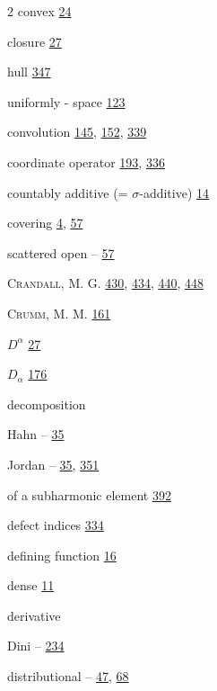 \begin{multicols}{2}
\noindent convex \hyperlink{page.24}{24}\par
\hspace*{1.1em}closure \hyperlink{page.27}{27}\par
\hspace*{1.1em}hull \hyperlink{page.347}{347}\par
\hspace*{1.1em}uniformly - space \hyperlink{page.123}{123}\par
\noindent convolution \hyperlink{page.145}{145}, \hyperlink{page.152}{152}, \hyperlink{page.339}{339}\par
\noindent coordinate operator \hyperlink{page.193}{193}, \hyperlink{page.336}{336}\par
\noindent countably additive (= $\sigma$-additive) \hyperlink{page.14}{14}\par
\noindent covering \hyperlink{page.4}{4}, \hyperlink{page.57}{57}\par
\hspace*{1.1em}scattered open -- \hyperlink{page.57}{57}\par
\noindent \textsc{Crandall}, M. G. \hyperlink{page.430}{430}, \hyperlink{page.434}{434}, \hyperlink{page.440}{440}, \hyperlink{page.448}{448}\par
\noindent \textsc{Crumm}, M. M. \hyperlink{page.161}{161}\par
\noindent $D^{\alpha}$ \hyperlink{page.27}{27}\par
\noindent $D_{\alpha}$ \hyperlink{page.176}{176}\par
\noindent decomposition\par
\hspace*{1.1em}Hahn -- \hyperlink{page.35}{35}\par
\hspace*{1.1em}Jordan -- \hyperlink{page.35}{35}, \hyperlink{page.351}{351}\par
\hspace*{1.1em}of a subharmonic element \hyperlink{page.392}{392}\par
\noindent defect indices \hyperlink{page.334}{334}\par
\noindent defining function \hyperlink{page.16}{16}\par
\noindent dense \hyperlink{page.11}{11}\par
\noindent derivative\par
\hspace*{1.1em}Dini -- \hyperlink{page.234}{234}\par
\hspace*{1.1em}distributional -- \hyperlink{page.47}{47}, \hyperlink{page.68}{68}\par

\end{multicols}
